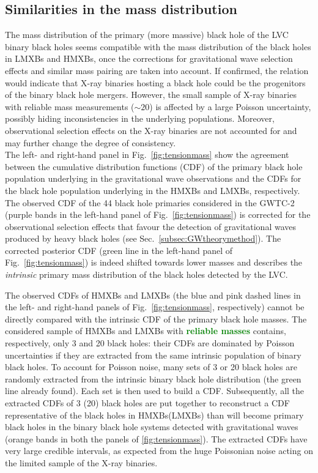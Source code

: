 \documentclass[a4paper,titlepage]{book}     	%
\newcommand{\erika}[1]{\textcolor{green}{\bf#1}}
\begin{document}
\subsection{Similarities in the mass distribution}
The mass distribution of the primary (more massive) black hole of the LVC binary black holes seems compatible with the mass distribution of the black holes in LMXBs and HMXBs, once the corrections for gravitational wave selection effects and similar mass pairing are taken into account. If confirmed, the relation would indicate that X-ray binaries hosting a black hole could be the progenitors of the binary black hole mergers. However, the small sample of X-ray binaries with reliable mass measurements ($\sim 20$) is affected by a large Poisson uncertainty, possibly hiding inconsistencies in the underlying populations. Moreover, observational selection effects on the X-ray binaries are not accounted for and may further change the degree of consistency. \\

The left- and right-hand panel in Fig.\ \ref{fig:tensionmass} show the agreement between the cumulative distribution functions (CDF) of the primary black hole population underlying in the gravitational wave observations and the CDFs for the black hole population underlying in the HMXBs and LMXBs, respectively. The observed CDF of the 44 black hole primaries considered in the GWTC-2 (purple bands in the left-hand panel of Fig.\ \ref{fig:tensionmass}) is corrected for the observational selection effects that favour the detection of gravitational waves produced by heavy black holes (see Sec.\ \ref{subsec:GWtheorymethod}). The corrected posterior CDF (green line in the left-hand panel of Fig.\ \ref{fig:tensionmass}) is indeed shifted towards lower masses and describes the \textit{intrinsic} primary mass distribution of the black holes detected by the LVC. 

The observed CDFs of HMXBs and LMXBs (the blue and pink dashed lines in the left- and right-hand panels of Fig.\ \ref{fig:tensionmass}, respectively) cannot be directly compared with the intrinsic CDF of the primary black hole masses. The considered sample of HMXBs and LMXBs with \erika{reliable masses} contains, respectively, only 3 and 20 black holes: their CDFs are dominated by Poisson uncertainties if they are extracted from the same intrinsic population of binary black holes. To account for Poisson noise, many sets of 3 or 20 black holes are randomly extracted from the intrinsic binary black hole distribution (the green line already found). Each set is then used to build a CDF. Subsequently, all the extracted CDFs of 3 (20) black holes are put together to reconstruct a CDF representative of the black holes in HMXBs(LMXBs) than will become primary black holes in the binary black hole systems detected with gravitational waves (orange bands in both the panels of \ref{fig:tensionmass}). The extracted CDFs have very large credible intervals, as expected from the huge Poissonian noise acting on the limited sample of the X-ray binaries. \\
\end{document}
